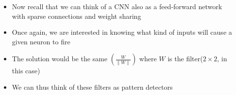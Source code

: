 
\begin{frame}
	\begin{columns}
		\begin{column}{0.5\textwidth}
			\begin{overprint}
				
			\end{overprint}
			       
		\end{column}
		\begin{column}{0.5\textwidth}
			\begin{itemize}
				\justifying
				\setlength\itemsep{1em}
				\item<1-> Now recall that we can think of a CNN also as a feed-forward network with sparse connections and weight sharing
				\item<2-> Once again, we are interested in knowing what kind of inputs will cause a given neuron to fire 
				\item<3-> The solution would be the same $(\frac{W}{\parallel W \parallel})$ where $W$ is the filter($2\times 2$, in this case)
				\item<4-> We can thus think of these filters as pattern detectors
			\end{itemize}
		\end{column}
		   
	\end{columns}
\end{frame}


